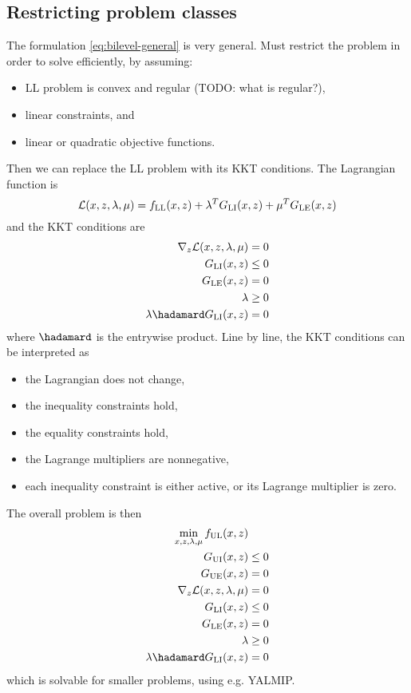 \subsection{Restricting problem classes}
The formulation \eqref{eq:bilevel-general} is very general. Must restrict the problem in order to solve efficiently, by assuming:
%
\begin{itemize}
  \item LL problem is convex and regular (TODO: what is regular?),
  \item linear constraints, and
  \item linear or quadratic objective functions.
\end{itemize}
%
Then we can replace the LL problem with its KKT conditions. The Lagrangian function is
%
\begin{equation}
  \mathcal{L}(x,z,\lambda,\mu) = f_\mathrm{LL}(x,z) + \lambda^T G_\mathrm{LI}(x,z) + \mu^T G_\mathrm{LE}(x,z)
\end{equation}
%
and the KKT conditions are
%
\begin{equation}\label{eq:kkt-lower-level}
  \begin{split}
    \nabla_z \mathcal{L}(x,z,\lambda,\mu) &= 0 \\
    G\sub{LI}(x,z) &\leq 0 \\
    G\sub{LE}(x,z) &= 0 \\
    \lambda &\geq 0 \\
    \lambda \hadamard G\sub{LI}(x,z) &= 0
  \end{split}
\end{equation}
%
where $\hadamard$ is the entrywise product. Line by line, the KKT conditions can be interpreted as
%
\begin{itemize}
  \item the Lagrangian does not change,
  \item the inequality constraints hold,
  \item the equality constraints hold,
  \item the Lagrange multipliers are nonnegative,
  \item each inequality constraint is either active, or its Lagrange multiplier is zero.
\end{itemize}
%
The overall problem is then
%
\begin{equation}\label{eq:bilevel-kkt}
  \begin{split}
    \min_{x,z,\lambda,\mu} f\sub{UL}(x,z) & \\
    G\sub{UI}(x,z) & \leq 0 \\
    G\sub{UE}(x,z) &= 0 \\
    \nabla_z \mathcal{L}(x,z,\lambda,\mu) &= 0 \\
    G\sub{LI}(x,z) &\leq 0 \\
    G\sub{LE}(x,z) &= 0 \\
    \lambda &\geq 0 \\
    \lambda \hadamard G\sub{LI}(x,z) &= 0 \\
  \end{split}
\end{equation}
%
which is solvable for smaller problems, using e.g. YALMIP.

